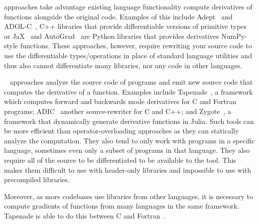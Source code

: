  approaches take advantage existing language functionality compute derivatives of functions alongside the original code. Examples of this include Adept~\cite{adept} and ADOL-C~\cite{griewank1996algorithm}, C++ libraries that provide differentiable versions of primitive types or JaX~\cite{jax2018github} and AutoGrad~\cite{maclaurin2015autograd} are Python libraries that provides derivatives NumPy-style functions. These approaches, however, require rewriting your source code to use the differentiable types/operations in place of standard language utilities and thus also cannot differentiate many libraries, nor any code in other languages.

~\cite{10.5555/1455489} approaches analyze the source code of programs and emit new source code that computes the derivative of a function. Examples include Tapenade~\cite{TapenadeRef13}, a framework which computes forward and backwards mode derivatives for C and Fortran programs; ADIC~\cite{narayanan2010adic2} another source-rewriter for C and C++; and Zygote~\cite{zygoteArxiv,zygoteDP,zygoteMlsys}, a framework that dynamically generate derivative functions in Julia. Such tools can be more efficient than operator-overloading approaches as they can statically analyze the computation. They also tend to only work with programs in a specific language, sometimes even only a subset of programs in that language. They also require all of the source to be differentiated to be available to the tool. This makes them difficult to use with header-only libraries and impossible to use with precompiled libraries.

Moreover, as more codebases use libraries from other languages, it is necessary to compute gradients of functions from many languages in the same framework. Tapenade is able to do this between C and Fortran~\cite{pascual2016mixed}.

